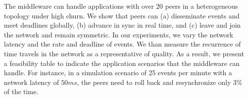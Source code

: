 \documentclass[fleqn,10pt]{SelfArx}
\begin{document}
The middleware can handle applications with over 20 peers in a heterogeneous
topology under high churn.
%
We show that peers can
    (a) disseminate events and meet deadlines globally, 
    (b) advance in sync in real time, and
    (c) leave and join the network and remain symmetric.
%
In our experiments, we vary the network latency and the rate and deadline of
events.
We than measure the recurrence of time travels in the network as a
representative of quality.
%
As a result, we present a feasibility table to indicate the application
scenarios that the middleware can handle.
For instance, in a simulation scenario of 25 events per minute with a network
latency of $50ms$, the peers need to roll back and resynchronize only $3\%$ of
the time.




\makeatletter
\renewcommand\@biblabel[1]{{\parbox{0.7cm}{[#1]}}}
\makeatother
\renewcommand{\refname}{References}


\balance
\end{document}
